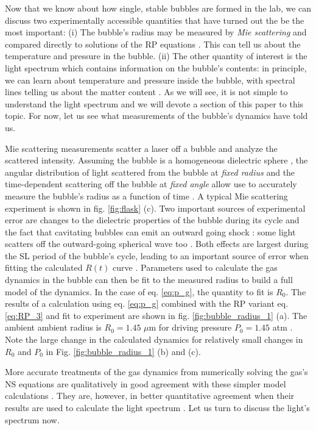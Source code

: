 \documentclass[rmp,aps,nofootinbib,superscriptaddress,floatfix]{revtex4-2}
\begin{document}
Now that we know about how single, stable bubbles are formed in the lab, we can discuss two experimentally accessible quantities that have turned out the be the most important: (i) The bubble's radius may be measured by \emph{Mie scattering} and compared directly to solutions of the RP equations \cite{}. This can tell us about the temperature and pressure in the bubble. (ii) The other quantity of interest is the light spectrum which contains information on the bubble's contents: in principle, we can learn about temperature and pressure inside the bubble, with spectral lines telling us about the matter content \cite{}. As we will see, it is not simple to understand the light spectrum \cite{} and we will devote a section of this paper to this topic. For now, let us see what measurements of the bubble's dynamics have told us. 

Mie scattering measurements scatter a laser off a bubble and analyze the scattered intensity. Assuming the bubble is a homogeneous dielectric sphere \cite{}, the angular distribution of light scattered from the bubble at \emph{fixed radius} and the time-dependent scattering off the bubble at \emph{fixed angle} allow use to accurately measure the bubble's radius as a function of time \cite{}. A typical Mie scattering experiment is shown in fig. \ref{fig:flask} (c). Two important sources of experimental error are changes to the dielectric properties of the bubble during its cycle \cite{} and the fact that cavitating bubbles can emit an outward going shock \cite{}: some light scatters off the outward-going spherical wave too \cite{}. Both effects are largest during the SL period of the bubble's cycle, leading to an important source of error when fitting the calculated $R(t)$ curve \cite{}. Parameters used to calculate the gas dynamics in the bubble can then be fit to the measured radius to build a full model of the dynamics. In the case of eq. \ref{eq:p_g}, the quantity to fit is $R_0$. The results of a calculation using eq. \ref{eq:p_g} combined with the RP variant eq. \ref{eq:RP_3} and fit to experiment are shown in fig. \ref{fig:bubble_radius_1} (a). The ambient ambient radius is $R_0=1.45$ $\mu$m for driving pressure $P_0=1.45$ atm \cite{barber1997defining,barber1992light}. Note the large change in the calculated dynamics for relatively small changes in $R_0$ and $P_0$ in Fig. \ref{fig:bubble_radius_1} (b) and (c). 

More accurate treatments of the gas dynamics from numerically solving the gas's NS equations are qualitatively in good agreement with these simpler model calculations \cite{brenner2002single,yasui2018acoustic}. They are, however, in better quantitative agreement when their results are used to calculate the light spectrum \cite{an2009diagnosing,an2008spectral,an2006mechanism,flannigan2005plasma,flannigan2006measurement,suslick2008inside}. Let us turn to discuss the light's spectrum now.
\end{document}
